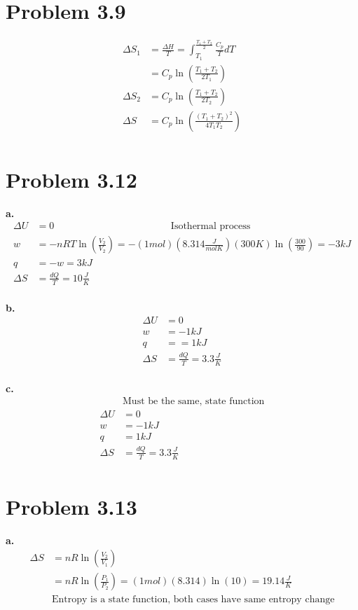 \documentclass[10pt]{article} %
\begin{document}
\section{Problem 3.9}
\begin{align*}
  \Delta S_1 &= \frac{\Delta H}{T} = \int_{T_1}^{\frac{T_1+T_2}{2}} \frac{C_p}{T}dT\\
    &= C_p\ln\left(\frac{T_1+T_2}{2T_1}\right)\\
    \Delta S_2 &= C_p\ln\left(\frac{T_1+T_2}{2T_2}\right)\\
    \Delta S &= C_p\ln\left(\frac{\left(T_1+T_2\right)^2}{4T_1T_2}\right)\\
\end{align*}

\section{Problem 3.12}
\textbf{a.}
\begin{align*}
  \Delta U &= 0
  \hspace{5cm} \mbox{Isothermal process}\\
  w &= -nRT\ln\left(\frac{V_2}{V_2}\right) = -(1 mol)(8.314 \frac{J}{mol K})(300K)\ln\left(\frac{300}{90}\right) = -3kJ\\
  q &= -w = 3kJ\\
  \Delta S &= \frac{dQ}{T} = 10 \frac{J}{K}\\
\end{align*}

\textbf{b.}
\begin{align*}
  \Delta U &= 0\\
  w &=  -1kJ\\
  q &= = 1kJ\\
  \Delta S &= \frac{dQ}{T} = 3.3 \frac{J}{K}\\
\end{align*}

\textbf{c.}
\begin{align*}
  &\mbox{Must be the same, state function}\\
  \Delta U &= 0\\
  w &=  -1kJ\\
  q &= 1kJ\\
  \Delta S &= \frac{dQ}{T} = 3.3 \frac{J}{K}\\
\end{align*}

\section{Problem 3.13}
\textbf{a.}
\begin{align*}
  \Delta S &= nR\ln\left(\frac{V_2}{V_1}\right)\\
  &= nR\ln\left(\frac{P_1}{P_2}\right) = (1 mol)(8.314)\ln(10) = 19.14 \frac{J}{K}\\
  &\mbox{Entropy is a state function, both cases have same entropy change}\\
\end{align*}
\end{document}
